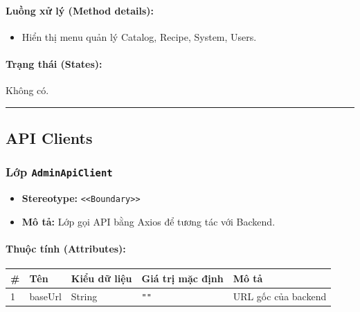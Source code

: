 \documentclass[12pt,a4paper]{article}
\begin{document}
\paragraph{Luồng xử lý (Method details):}
\begin{itemize}[leftmargin=*]
    \item Hiển thị menu quản lý Catalog, Recipe, System, Users.
\end{itemize}


\paragraph{Trạng thái (States):}
Không có.

\vskip 0.5cm
\noindent\rule{\textwidth}{0.5pt}
\vskip 0.5cm

\subsection{API Clients}


\subsubsection{Lớp \texttt{AdminApiClient}}

\begin{itemize}[leftmargin=*]
    \item \textbf{Stereotype:} \texttt{\textless{}\textless{}Boundary\textgreater{}\textgreater{}}
    \item \textbf{Mô tả:} Lớp gọi API bằng Axios để tương tác với Backend.
\end{itemize}

\paragraph{Thuộc tính (Attributes):}
\begin{longtable}{|p{0.6cm}|p{3.5cm}|p{2.4cm}|p{1.8cm}|p{5.1cm}|}
\hline
\textbf{\#} & \textbf{Tên} & \textbf{Kiểu dữ liệu} & \textbf{Giá trị mặc định} & \textbf{Mô tả} \\ \hline
\endhead
1 & baseUrl & String & \texttt{""} & URL gốc của backend \\ \hline
\end{longtable}
\end{document}
